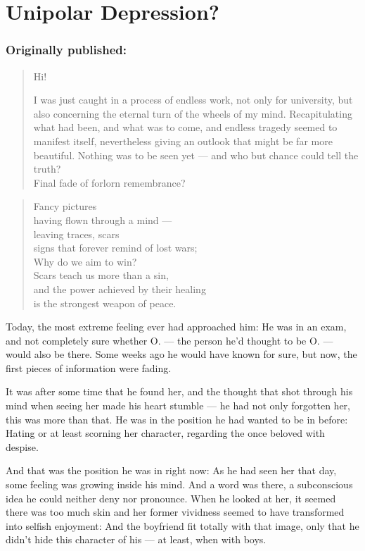 \chapter{Unipolar Depression?}
\label{cha:unipolar-depression}
\subsection*{Originally published: }
\begin{quote}
Hi! 

I was just caught in a process of endless work, not only for university, but also concerning the eternal turn of the wheels of my mind. Recapitulating what had been, and what was to come, and endless tragedy seemed to manifest itself, nevertheless giving an outlook that might be far more beautiful. Nothing was to be seen yet --- and who but chance could tell the truth?\\
Final fade of forlorn remembrance?
\end{quote}

\begin{verse}
Fancy pictures \\
having flown through a mind --- \\
leaving traces, scars \\
signs that forever remind of lost wars; \\
Why do we aim to win? \\
Scars teach us more than a sin, \\
and the power achieved by their healing \\
is the strongest weapon of peace.
\end{verse}
Today, the most extreme feeling ever had approached him: He was in an exam, and not completely sure whether O. --- the person he'd thought to be O. --- would also be there. Some weeks ago he would have known for sure, but now, the first pieces of information were fading.

It was after some time that he found her, and the thought that shot through his mind when seeing her made his heart stumble --- he had not only forgotten her, this was more than that. 
He was in the position he had wanted to be in before: Hating or at least scorning her character, regarding the once beloved with despise.

And that was the position he was in right now: As he had seen her that day, some feeling was growing inside his mind. And a word was there, a subconscious idea he could neither deny nor pronounce. 
When he looked at her, it seemed there was too much skin and her former vividness seemed to have transformed into selfish enjoyment: And the boyfriend fit totally with that image, only that he didn't hide this character of his --- at least, when with boys.

